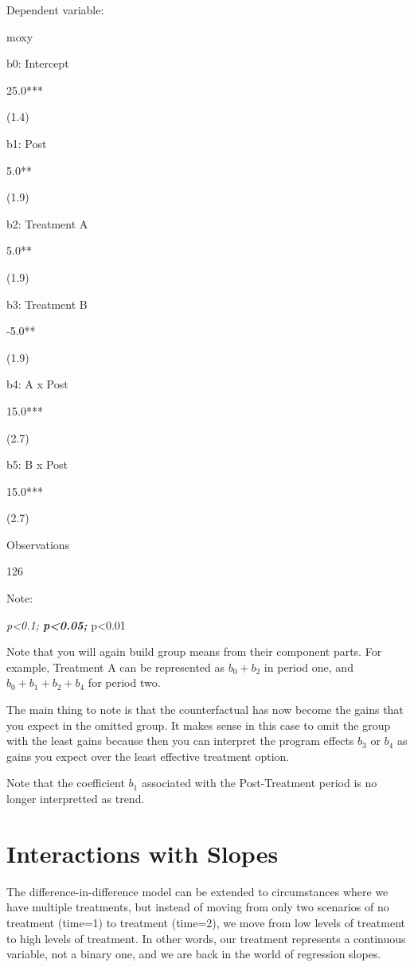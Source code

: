 \documentclass[]{book}
\theoremstyle{definition}
\theoremstyle{definition}
\theoremstyle{definition}
\theoremstyle{remark}
\begin{document}
Dependent variable:

moxy

b0: Intercept

25.0***

(1.4)

b1: Post

5.0**

(1.9)

b2: Treatment A

5.0**

(1.9)

b3: Treatment B

-5.0**

(1.9)

b4: A x Post

15.0***

(2.7)

b5: B x Post

15.0***

(2.7)

Observations

126

Note:

\emph{p\textless{}0.1; \textbf{p\textless{}0.05; }}p\textless{}0.01

Note that you will again build group means from their component parts.
For example, Treatment A can be represented as \(b_{0} + b_{2}\) in
period one, and \(b_{0} + b_{1} + b_{2} + b_{4}\) for period two.

The main thing to note is that the counterfactual has now become the
gains that you expect in the omitted group. It makes sense in this case
to omit the group with the least gains because then you can interpret
the program effects \(b_{3}\) or \(b_{4}\) as gains you expect over the
least effective treatment option.

Note that the coefficient \(b_{1}\) associated with the Post-Treatment
period is no longer interpretted as trend.

\hypertarget{interactions-with-slopes}{%
\chapter{Interactions with Slopes}\label{interactions-with-slopes}}

The difference-in-difference model can be extended to circumstances
where we have multiple treatments, but instead of moving from only two
scenarios of no treatment (time=1) to treatment (time=2), we move from
low levels of treatment to high levels of treatment. In other words, our
treatment represents a continuous variable, not a binary one, and we are
back in the world of regression slopes.
\end{document}
